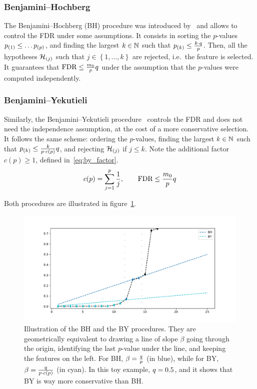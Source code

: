\subsubsection{Benjamini–Hochberg}\label{subsubsec:bh}

The Benjamini–Hochberg (BH) procedure was introduced by~\cite{bh} and allows to control the FDR under some
assumptions.
It consists in sorting the $p$-values $p_{(1)} \leq \dots p_{(p)}$,
and finding the largest $k \in \mathbb{N}$ such that $p_{(k)} \leq \frac{k \cdot q}{p}$.
Then, all the hypotheses $\mathcal{H}_{(j)}$ such that $j \in \left\{ 1, \dots, k \right\}$ are rejected,
i.e.\ the feature is selected.
It guarantees that $\text{FDR} \leq \frac{m_0}{p}q$ under the assumption that the $p$-values were computed
independently.

\subsubsection{Benjamini–Yekutieli}\label{subsubsec:by}

Similarly, the Benjamini–Yekutieli procedure~\cite{by} controls the FDR and does not need the independence assumption,
at the cost of a more conservative selection.
It follows the same scheme:
ordering the $p$-values,
finding the largest $k \in \mathbb{N}$ such that $p_{(k)} \leq \frac{k}{p \cdot c(p)}q$,
and rejecting $\mathcal{H}_{(j)}$ if $j \leq k$.
Note the additional factor $c(p) \geq 1$, defined in~\ref{eq:by_factor}.
\begin{equation}\label{eq:by_factor}
c(p) = \sum_{j = 1}^p \frac{1}{j}
,\qquad
\text{FDR} \leq \frac{m_0}{p}q
\end{equation}

Both procedures are illustrated in figure~\ref{fig:bhy}.
\begin{figure}[h]
    \centering
    \includegraphics[width=1.\textwidth]{figures/bhy.pdf}
    \caption{
    Illustration of the BH and the BY procedures.
    They are geometrically equivalent to drawing a line of slope $\beta$ going through the origin,
    identifying the last $p$-value under the line, and keeping the features on the left.
    For BH, $\beta = \frac{q}{p}$ (in blue),
    while for BY, $\beta = \frac{q}{p \cdot c(p)}$ (in cyan).
    In this toy example, $q = 0.5$, and it shows that BY is way more conservative than BH.
    }
    \label{fig:bhy}
\end{figure}

